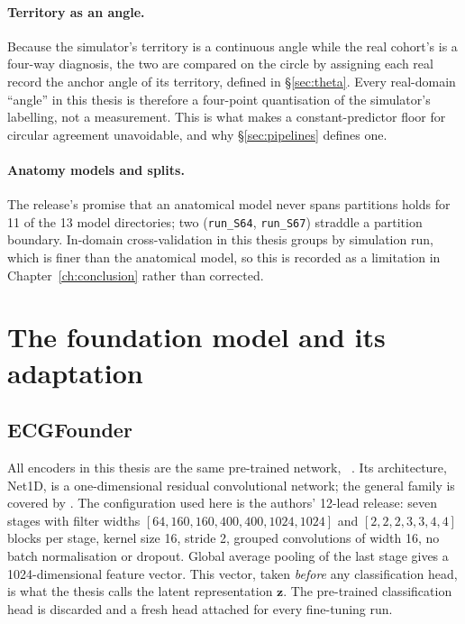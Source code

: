 \paragraph{Territory as an angle.}
\label{sec:angle}
Because the simulator's territory is a continuous angle while the real cohort's is a four-way diagnosis, the two are compared on the circle by assigning each real record the anchor angle of its territory, defined in \S\ref{sec:theta}. Every real-domain ``angle'' in this thesis is therefore a four-point quantisation of the simulator's labelling, not a measurement. This is what makes a constant-predictor floor for circular agreement unavoidable, and why \S\ref{sec:pipelines} defines one. 

\paragraph{Anatomy models and splits.}
The release's promise that an anatomical model never spans partitions holds for 11 of the 13 model directories; two (\texttt{run\_S64}, \texttt{run\_S67}) straddle a partition boundary. In-domain cross-validation in this thesis groups by simulation run, which is finer than the anatomical model, so this is recorded as a limitation in Chapter~\ref{ch:conclusion} rather than corrected. 

\section[The foundation model and its adaptation]{The foundation model and its adaptation}
\label{sec:encoder}

\subsection{ECGFounder}
All encoders in this thesis are the same pre-trained network, \ecgfounder~\citep{li2024ecgfounder}. Its architecture, Net1D, is a one-dimensional residual convolutional network; the general family is covered by \citet{goodfellow2016deep}. The configuration used here is the authors' 12-lead release: seven stages with filter widths $[64,160,160,400,400,1024,1024]$ and $[2,2,2,3,3,4,4]$ blocks per stage, kernel size 16, stride 2, grouped convolutions of width 16, no batch normalisation or dropout. Global average pooling of the last stage gives a 1024-dimensional feature vector. This vector, taken \emph{before} any classification head, is what the thesis calls the latent representation $\mathbf{z}$. The pre-trained classification head is discarded and a fresh head attached for every fine-tuning run. 

